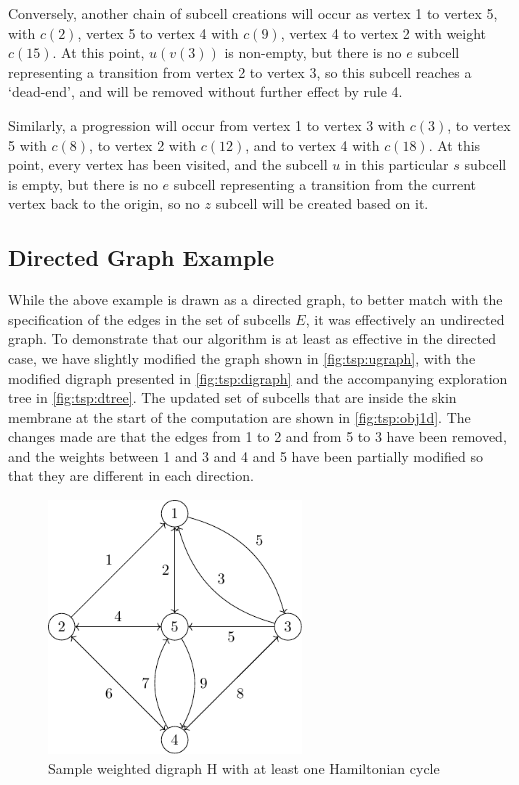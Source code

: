 Conversely, another chain of subcell creations will occur as vertex 1 to vertex 5, with \(c(2)\), vertex 5 to vertex 4 with \(c(9)\), vertex 4 to vertex 2 with weight \(c(15)\).  At this point, \(u(v(3))\) is non-empty, but there is no \(e\) subcell representing a transition from vertex 2 to vertex 3, so this subcell reaches a `dead-end', and will be removed without further effect by rule 4.

Similarly, a progression will occur from vertex 1 to vertex 3 with \(c(3)\), to vertex 5 with \(c(8)\), to vertex 2 with \(c(12)\), and to vertex 4 with \(c(18)\).  At this point, every vertex has been visited, and the subcell \(u\) in this particular \(s\) subcell is empty, but there is no \(e\) subcell representing a transition from the current vertex back to the origin, so no \(z\) subcell will be created based on it.


\subsection{Directed Graph Example}
While the above example is drawn as a directed graph, to better match with the specification of the edges in the set of subcells \(E\), it was effectively an undirected graph.  To demonstrate that our algorithm is at least as effective in the directed case, we have slightly modified the graph shown in \autoref{fig:tsp:ugraph}, with the modified digraph presented in \autoref{fig:tsp:digraph} and the accompanying exploration tree in \autoref{fig:tsp:dtree}.  The updated set of subcells that are inside the skin membrane at the start of the computation are shown in \autoref{fig:tsp:obj1d}.  The changes made are that the edges from 1 to 2 and from 5 to 3 have been removed, and the weights between 1 and 3 and 4 and 5 have been partially modified so that they are different in each direction.

\begin{figure}
\centering
\includegraphics[width=0.6\textwidth]{chapters/tsp/figs/ugraph-figure2}
\caption{\label{fig:tsp:digraph}Sample weighted digraph H with at least one Hamiltonian cycle}
\end{figure}

